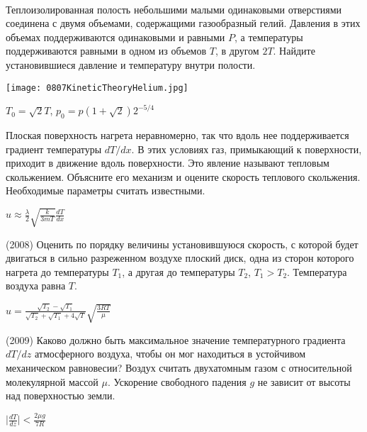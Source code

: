 \begin{ex}
\hspace{0pt} \\
\begin{minipage}{.65\textwidth}
Теплоизолированная полость небольшими малыми одинаковыми отверстиями соединена с двумя объемами, содержащими газообразный гелий. 
Давления в этих объемах поддерживаются одинаковыми и равными $P$, а температуры поддерживаются равными в одном из объемов $T$, в другом $2T$. 
Найдите установившиеся давление и температуру внутри полости.
\end{minipage}
\begin{minipage}{.35\textwidth}
\centering
\texttt{[image: 0807KineticTheoryHelium.jpg]}
\end{minipage}
\begin{ans}
$T_0 = \sqrt{2}T$, $p_0=p(1+\sqrt{2})2^{-5/4}$
\end{ans}
\end{ex}

\begin{ex}
Плоская поверхность нагрета неравномерно, так что вдоль нее поддерживается градиент температуры $dT/dx$. 
В этих условиях газ, примыкающий к поверхности, приходит в движение вдоль поверхности. Это явление называют тепловым скольжением. 
Объясните его механизм и оцените скорость теплового скольжения. Необходимые параметры считать известными.
\begin{ans}
$u \approx \frac{\lambda}{2}\sqrt{\frac{k}{3mT}}\frac{dT}{dx}$
\end{ans}
\end{ex}

\begin{ex}
(2008) Оценить по порядку величины установившуюся скорость, с которой будет двигаться в сильно разреженном воздухе плоский диск, одна из сторон которого нагрета до температуры $T_1$, а другая до температуры $T_2$, $T_1>T_2$. Температура воздуха равна $T$.
\begin{ans}
$u = \frac{\sqrt{T_2}-\sqrt{T_1}}{\sqrt{T_2}+\sqrt{T_1}+4\sqrt{T}} \sqrt{\frac{3RT}{\mu}}$
\end{ans}
\end{ex}

\begin{ex}
(2009) Каково должно быть максимальное значение температурного градиента $dT/dz$ атмосферного воздуха, 
чтобы он мог находиться в устойчивом механическом равновесии? Воздух считать двухатомным газом с относительной молекулярной массой $\mu$. 
Ускорение свободного падения $g$ не зависит от высоты над поверхностью земли.
\begin{ans}
$\mid \frac{dT}{dz} \mid < \frac{2\mu g}{7R}$
\end{ans}
\end{ex}